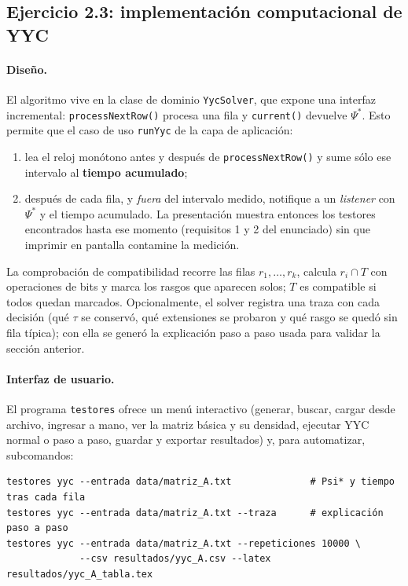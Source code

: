 \documentclass[11pt, a4paper]{article}
\theoremstyle{definition}
\theoremstyle{plain}
\newcommand{\Psis}{\Psi^{*}}
\begin{document}
\subsection{Ejercicio 2.3: implementación computacional de YYC}

\paragraph{Diseño.} El algoritmo vive en la clase de dominio \texttt{YycSolver}, que
expone una interfaz incremental: \texttt{processNextRow()} procesa una fila y
\texttt{current()} devuelve $\Psis$. Esto permite que el caso de uso
\texttt{runYyc} de la capa de aplicación:
\begin{enumerate}[nosep]
\item lea el reloj monótono antes y después de \texttt{processNextRow()} y sume
  sólo ese intervalo al \textbf{tiempo acumulado};
\item después de cada fila, y \emph{fuera} del intervalo medido, notifique a un
  \emph{listener} con $\Psis$ y el tiempo acumulado. La presentación muestra
  entonces los testores encontrados hasta ese momento (requisitos 1 y 2 del
  enunciado) sin que imprimir en pantalla contamine la medición.
\end{enumerate}
La comprobación de compatibilidad recorre las filas $r_1,\dots,r_k$, calcula
$r_i\cap T$ con operaciones de bits y marca los rasgos que aparecen solos;
$T$ es compatible si todos quedan marcados. Opcionalmente, el solver registra
una traza con cada decisión (qué $\tau$ se conservó, qué extensiones se probaron
y qué rasgo se quedó sin fila típica); con ella se generó la
explicación paso a paso usada para validar la sección anterior.

\paragraph{Interfaz de usuario.} El programa \texttt{testores} ofrece un menú
interactivo (generar, buscar, cargar desde archivo, ingresar a mano, ver la
matriz básica y su densidad, ejecutar YYC normal o paso a paso, guardar y
exportar resultados) y, para automatizar, subcomandos:

\begin{Verbatim}[fontsize=\small, frame=single]
testores yyc --entrada data/matriz_A.txt              # Psi* y tiempo tras cada fila
testores yyc --entrada data/matriz_A.txt --traza      # explicación paso a paso
testores yyc --entrada data/matriz_A.txt --repeticiones 10000 \
             --csv resultados/yyc_A.csv --latex resultados/yyc_A_tabla.tex
\end{Verbatim}
\end{document}
